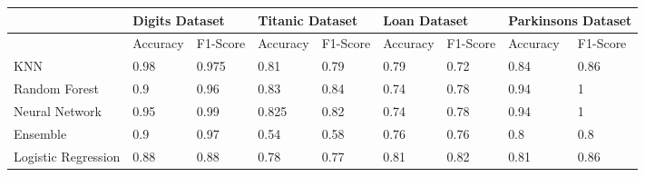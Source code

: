 \documentclass[letterpaper]{article}
\begin{document}
\begin{table}[]
	\centering
	\begin{tabular}{|l|ll|ll|ll|ll|}
		\hline
		               & \multicolumn{2}{l|}{Digits Dataset} & \multicolumn{2}{l|}{Titanic Dataset} & \multicolumn{2}{l|}{Loan Dataset} & \multicolumn{2}{l|}{Parkinsons Dataset}                                                                                       \\ \hline
		               & \multicolumn{1}{l|}{Accuracy}       & F1-Score                             & \multicolumn{1}{l|}{Accuracy}     & F1-Score                                & \multicolumn{1}{l|}{Accuracy} & F1-Score & \multicolumn{1}{l|}{Accuracy} & F1-Score \\ \hline
		KNN            & \multicolumn{1}{l|}{0.98}           & 0.975                                 & \multicolumn{1}{l|}{0.81}        & 0.79                                    & \multicolumn{1}{l|}{0.79}     & 0.72     & \multicolumn{1}{l|}{0.84}     & 0.86         \\ \hline
		Random Forest  & \multicolumn{1}{l|}{0.9}            & 0.96                                 & \multicolumn{1}{l|}{0.83}         & 0.84                                    & \multicolumn{1}{l|}{0.74}     & 0.78     & \multicolumn{1}{l|}{0.94}     & 1        \\ \hline
		Neural Network & \multicolumn{1}{l|}{0.95}           & 0.99                                 & \multicolumn{1}{l|}{0.825}        & 0.82                                    & \multicolumn{1}{l|}{0.74}     & 0.78     & \multicolumn{1}{l|}{0.94}     & 1        \\ \hline
		Ensemble       & \multicolumn{1}{l|}{0.9}            & 0.97                                 & \multicolumn{1}{l|}{0.54}         & 0.58                                    & \multicolumn{1}{l|}{0.76}     & 0.76     & \multicolumn{1}{l|}{0.8}      & 0.8      \\ \hline
		Logistic Regression       & \multicolumn{1}{l|}{0.88}            & 0.88                                & \multicolumn{1}{l|}{0.78}         & 0.77                                   & \multicolumn{1}{l|}{0.81}     & 0.82     & \multicolumn{1}{l|}{0.81}      & 0.86      \\ \hline

	\end{tabular}
\end{table}
\end{document}
